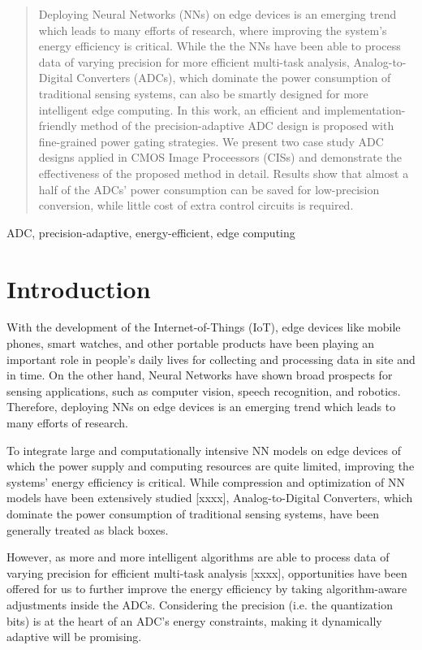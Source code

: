\documentclass[conference]{IEEEtran}
\begin{document}
\begin{abstract}
Deploying Neural Networks (NNs) on edge devices is an emerging trend which leads to many efforts of research, where improving the system's energy efficiency is critical.
While the the NNs have been able to process data of varying precision for more efficient multi-task analysis, Analog-to-Digital Converters (ADCs), 
which dominate the power consumption of traditional sensing systems, can also be smartly designed for more intelligent edge computing. 
In this work, an efficient and implementation-friendly method of the precision-adaptive ADC design is proposed with fine-grained power gating strategies.
We present two case study ADC designs applied in CMOS Image Proceessors (CISs) and demonstrate the effectiveness of the proposed method in detail. 
Results show that almost a half of the ADCs’ power consumption can be saved for low-precision conversion, while little cost of extra control circuits is required. 
\end{abstract}

\begin{IEEEkeywords}
ADC, precision-adaptive, energy-efficient, edge computing
\end{IEEEkeywords}

\section{Introduction}

With the development of the Internet-of-Things (IoT), edge devices like mobile phones, smart watches, and other portable products have been playing an important role in people’s daily lives 
for collecting and processing data in site and in time. On the other hand, Neural Networks have shown broad prospects for sensing applications, such as computer vision, speech recognition, 
and robotics. Therefore, deploying NNs on edge devices is an emerging trend which leads to many efforts of research. 

To integrate large and computationally intensive NN models on edge devices of which the power supply and computing resources are quite limited, improving the systems' energy efficiency is critical. 
While compression and optimization of NN models have been extensively studied [xxxx], Analog-to-Digital Converters, which dominate the power consumption of traditional sensing systems, 
have been generally treated as black boxes. 

However, as more and more intelligent algorithms are able to process data of varying precision for efficient multi-task analysis [xxxx], opportunities have been offered for us to further improve 
the energy efficiency by taking algorithm-aware adjustments inside the ADCs. Considering the precision (i.e. the quantization bits) is at the heart of an ADC’s energy constraints, 
making it dynamically adaptive will be promising.
\end{document}
